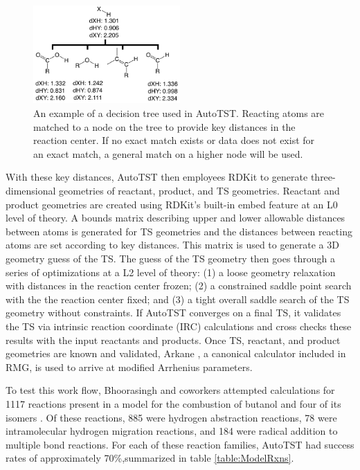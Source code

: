 \documentclass[preprint, 11pt]{elsarticle} %
\begin{document}
\begin{figure}[h!]
    \centering
    \includegraphics[width=0.5\textwidth]{autotst_tree.png}
    \caption{An example of a decision tree used in AutoTST. Reacting atoms are matched to a node on the tree to provide key distances in the reaction center. If no exact match exists or data does not exist for an exact match, a general match on a higher node will be used.}
    \label{fig:autotst_tree}
\end{figure}

With these key distances, AutoTST then employees RDKit \cite{RDKit:2018} to generate three-dimensional geometries of reactant, product, and TS geometries.
Reactant and product geometries are created using RDKit's built-in embed feature at an L0 level of theory. 
A bounds matrix describing upper and lower allowable distances between atoms is generated for TS geometries and the distances between reacting atoms are set according to key distances.
This matrix is used to generate a 3D geometry guess of the TS.
The guess of the TS geometry then goes through a series of optimizations at a L2 level of theory: (1) a loose geometry relaxation with distances in the reaction center frozen; (2) a constrained saddle point search with the the reaction center fixed; and (3) a tight overall saddle search of the TS geometry without constraints.
If AutoTST converges on a final TS, it validates the TS via intrinsic reaction coordinate (IRC) calculations \cite{Fukui:1970} and cross checks these results with the input reactants and products.
Once TS, reactant, and product geometries are known and validated, Arkane \cite{gao:2016}, a canonical calculator included in RMG, is used to arrive at modified Arrhenius parameters.

To test this work flow, Bhoorasingh and coworkers attempted calculations for 1117 reactions present in a model for the combustion of butanol and four of its isomers \cite{Sarathy:2012}.
Of these reactions, 885 were hydrogen abstraction reactions, 78 were intramolecular hydrogen migration reactions, and 184 were radical addition to multiple bond reactions. 
For each of these reaction families, AutoTST had success rates of approximately 70\%,summarized in table \ref{table:ModelRxns}.
\end{document}
